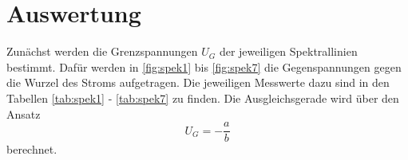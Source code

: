 \section{Auswertung}
\label{sec:Auswertung}

Zunächst werden die Grenzspannungen $U_G$ der jeweiligen Spektrallinien bestimmt.
Dafür werden in \autoref{fig:spek1} bis \autoref{fig:spek7} die Gegenspannungen gegen die Wurzel des Stroms aufgetragen.
Die jeweiligen Messwerte dazu sind in den Tabellen \ref{tab:spek1} - \ref{tab:spek7} zu finden.
Die Ausgleichsgerade wird über den Ansatz 
\begin{equation*}
  U_G = - \frac{a}{b}
\end{equation*}
berechnet.
